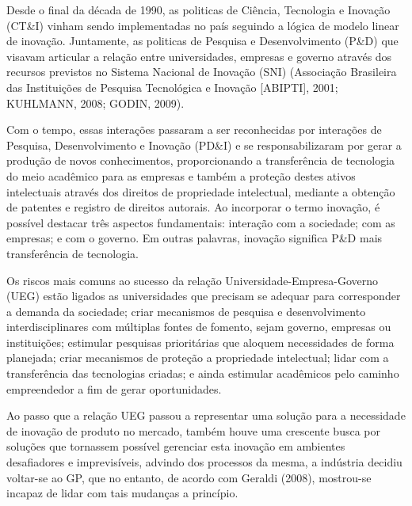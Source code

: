 Desde o final da década de 1990, as politicas de Ciência, Tecnologia e Inovação (CT\&I) vinham sendo implementadas no país seguindo a lógica de modelo linear de inovação. Juntamente, as politicas de Pesquisa e Desenvolvimento (P\&D) que visavam articular a relação entre universidades, empresas e governo através dos recursos previstos no Sistema Nacional de Inovação (SNI) (Associação Brasileira das Instituições de Pesquisa Tecnológica e Inovação [ABIPTI], 2001; KUHLMANN, 2008; GODIN, 2009).

Com o tempo, essas interações passaram a ser reconhecidas por interações de Pesquisa, Desenvolvimento e Inovação (PD\&I) e se responsabilizaram por gerar a produção de novos conhecimentos, proporcionando a transferência de tecnologia do meio acadêmico para as empresas e também a proteção destes ativos intelectuais através dos direitos de propriedade intelectual, mediante a obtenção de patentes e registro de direitos autorais. Ao incorporar o termo inovação, é possível destacar três aspectos fundamentais: interação com a sociedade; com as empresas; e com o governo. Em outras palavras, inovação significa P\&D mais transferência de tecnologia.

Os riscos mais comuns ao sucesso da relação Universidade-Empresa-Governo (UEG) estão ligados as universidades que precisam se adequar para corresponder a demanda da sociedade; criar mecanismos de pesquisa e desenvolvimento interdisciplinares com múltiplas fontes de fomento, sejam governo, empresas ou instituições; estimular pesquisas prioritárias que aloquem necessidades de forma planejada; criar mecanismos de proteção a propriedade intelectual; lidar com a transferência das tecnologias criadas; e ainda estimular acadêmicos pelo caminho empreendedor a fim de gerar oportunidades.

Ao passo que a relação UEG passou a representar uma solução para a necessidade de inovação de produto no mercado, também houve uma crescente busca por soluções que tornassem possível gerenciar esta inovação em ambientes desafiadores e imprevisíveis, advindo dos processos da mesma, a indústria decidiu voltar-se ao GP, que no entanto, de acordo com Geraldi (2008), mostrou-se incapaz de lidar com tais mudanças a princípio.

